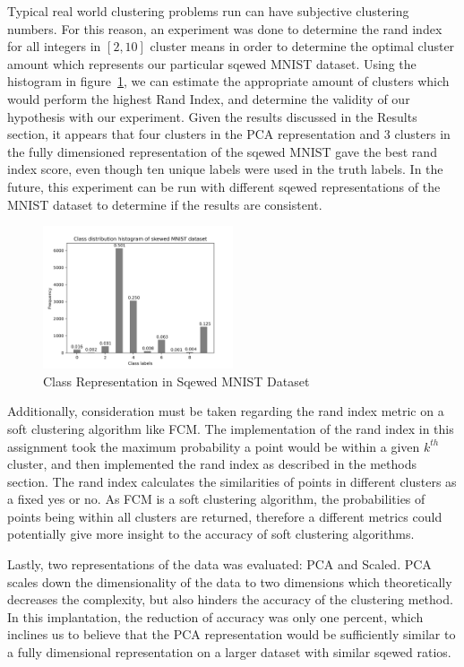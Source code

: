 Typical real world clustering problems run can have subjective clustering numbers. For this reason, an experiment was done to determine the rand index for all integers in $[2,10]$ cluster means in order to determine the optimal cluster amount which represents our particular sqewed MNIST dataset. Using the histogram in figure~\ref{fig:hist1}, we can estimate the appropriate amount of clusters which would perform the highest Rand Index, and determine the validity of our hypothesis with our experiment. Given the results discussed in the Results section, it appears that four clusters in the PCA representation and 3 clusters in the fully dimensioned representation of the sqewed MNIST gave the best rand index score, even though ten unique labels were used in the truth labels. In the future, this experiment can be run with different sqewed representations of the MNIST dataset to determine if the results are consistent. \par

\begin{figure}[H]
    \centering
    \includegraphics[width=0.5\textwidth]{class_histogram.png}
    \caption{Class Representation in Sqewed MNIST Dataset\label{fig:hist1}}    
\end{figure}

Additionally, consideration must be taken regarding the rand index metric on a soft clustering algorithm like FCM. The implementation of the rand index in this assignment took the maximum probability a point would be within a given $k^{th}$ cluster, and then implemented the rand index as described in the methods section. The rand index calculates the similarities of points in different clusters as a fixed yes or no. As FCM is a soft clustering algorithm, the probabilities of points being within all clusters are returned, therefore a different metrics could potentially give more insight to the accuracy of soft clustering algorithms. \par

Lastly, two representations of the data was evaluated: PCA and Scaled. PCA scales down the dimensionality of the data to two dimensions which theoretically decreases the complexity, but also hinders the accuracy of the clustering method. In this implantation, the reduction of accuracy was only one percent, which inclines us to believe that the PCA representation would be sufficiently similar to a fully dimensional representation on a larger dataset with similar sqewed ratios. 
